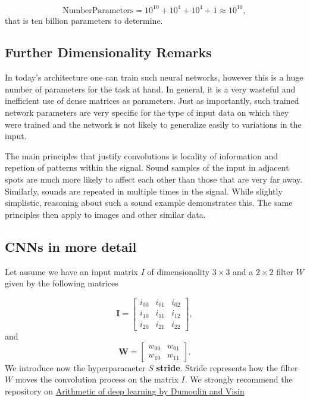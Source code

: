 \documentclass[%
oneside,                 %
final,                   %
10pt]{article}
\begin{document}
\[
\mathrm{NumberParameters}=10^{10}+10^4+10^4+1 \approx 10^{10},
\]
that is ten billion parameters to determine. 

\subsection*{Further Dimensionality Remarks}

In today’s architecture one can train such neural networks, however
this is a huge number of parameters for the task at hand. In general,
it is a very wasteful and inefficient use of dense matrices as
parameters. Just as importantly, such trained network parameters are
very specific for the type of input data on which they were trained
and the network is not likely to generalize easily to variations in
the input.

The main principles that justify convolutions is locality of
information and repetion of patterns within the signal. Sound samples
of the input in adjacent spots are much more likely to affect each
other than those that are very far away. Similarly, sounds are
repeated in multiple times in the signal. While slightly simplistic,
reasoning about such a sound example demonstrates this. The same
principles then apply to images and other similar data.

\subsection*{CNNs in more detail}

Let assume we have an input matrix $I$ of dimensionality $3\times 3$
and a $2\times 2$ filter $W$ given by the following matrices

\[
\bm{I}=\begin{bmatrix}i_{00} & i_{01} & i_{02}  \\
                      i_{10} & i_{11} & i_{12}  \\
	              i_{20} & i_{21} & i_{22} \end{bmatrix},
\]
and 
\[
\bm{W}=\begin{bmatrix}w_{00} & w_{01} \\
	              w_{10} & w_{11}\end{bmatrix}.
\]
We introduce now the hyperparameter $S$ \textbf{stride}. Stride represents how the filter $W$ moves the convolution process on the matrix $I$.
We strongly recommend the repository on \href{{https://github.com/vdumoulin/conv_arithmetic}}{Arithmetic of deep learning by Dumoulin and Visin} 
\end{document}

